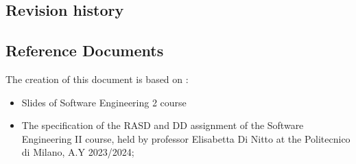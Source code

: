 \subsection{Revision history}



\subsection{Reference Documents}
The creation of this document is based on :
\begin{itemize}
    \item Slides of Software Engineering 2 course
    \item  The specification of the RASD and DD assignment of the Software Engineering II course, held by professor Elisabetta Di Nitto at the Politecnico di Milano, A.Y 2023/2024;
\end{itemize}


